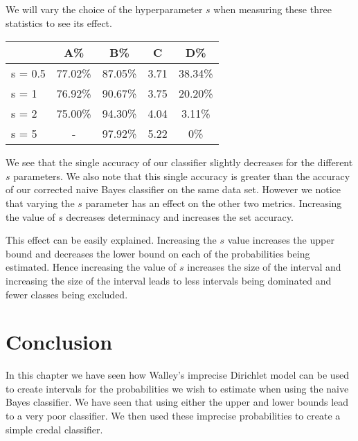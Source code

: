 We will vary the choice of the hyperparameter $s$ when measuring these three statistics to see its effect.


\begin{center}
\begin{tabular}{l|c c c c}
        & A\%     & B\%     & C    & D\%     \\
\hline
s = 0.5 & 77.02\% & 87.05\% & 3.71 & 38.34\% \\
s = 1   & 76.92\% & 90.67\% & 3.75 & 20.20\% \\
s = 2   & 75.00\% & 94.30\% & 4.04 & 3.11\% \\
s = 5   & -       & 97.92\% & 5.22 & 0\%   \\
\end{tabular}
\end{center}

We see that the single accuracy of our classifier slightly decreases for the different $s$ parameters.
We also note that this single accuracy is greater than the accuracy of our corrected naive Bayes classifier on the same data set.
However we notice that varying the $s$ parameter has an effect on the other two metrics.
Increasing the value of $s$ decreases determinacy and increases the set accuracy.

This effect can be easily explained.
Increasing the $s$ value increases the upper bound and decreases the lower bound on each of the probabilities being estimated.
Hence increasing the value of $s$ increases the size of the interval and increasing the size of the interval leads to less intervals being dominated and fewer classes being excluded.

\section{Conclusion}

In this chapter we have seen how Walley's imprecise Dirichlet model can be used to create intervals for the probabilities we wish to estimate when using the naive Bayes classifier.
We have seen that using either the upper and lower bounds lead to a very poor classifier.
We then used these imprecise probabilities to create a simple credal classifier.